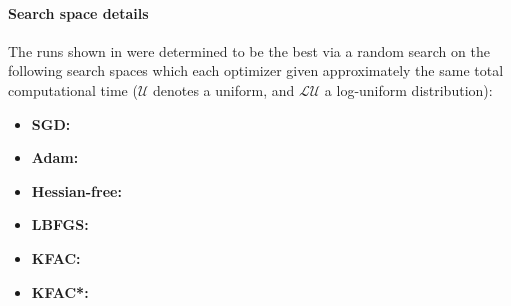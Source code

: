 \paragraph{Search space details} The runs shown in  were determined to be the best via a random search on the following search spaces which each optimizer given approximately the same total computational time ($\mathcal{U}$ denotes a uniform, and $\mathcal{LU}$ a log-uniform distribution):
\begin{itemize}
  \def\pathToRuns{kfac_pinns_exp/exp43_log_fokker_planck9d_isotropic_gaussian_random/tex}
\item \textbf{SGD:} 
\item \textbf{Adam:} 
\item \textbf{Hessian-free:} 
\item \textbf{LBFGS:} 
\item \textbf{KFAC:} 
\item \textbf{KFAC*:} 
\end{itemize}

